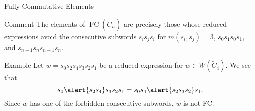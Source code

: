 \documentclass{beamer}
\newcommand{\w}{\overline{w}}
\DeclareMathOperator{\FC}{FC}
\newcommand{\C}{\widetilde{C}}
\begin{document}

\begin{frame}{Fully Commutative Elements}
\begin{block}{Comment}
	The elements of $\FC(\C_n)$ are precisely those whose reduced expressions avoid the consecutive subwords $s_is_js_i$ for $m(s_i,s_j)=3$, $s_0s_1s_0s_1$, and $s_{n-1}s_ns_{n-1}s_n$.
\end{block}

\pause

\begin{block}{Example}
	Let $\w=s_0s_2s_4s_3s_2s_1$ be a reduced expression for $w \in W(\C_4)$. We see that
	\[s_0\alert{s_2s_4}s_3s_2s_1=s_0s_4\alert{s_2s_3s_2}s_1.\]
	Since $w$ has one of the forbidden consecutive subwords, $w$ is \alert{not} FC.
\end{block}
		
\end{frame}

\end{document}
